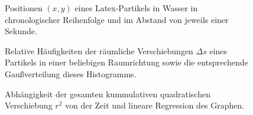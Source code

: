 \documentclass[12pt,a4paper,german]{scrartcl}
\numberwithin{equation}{section}
\begin{document}
  \begin{figure}[H]
    \centering
    
    \caption{Positionen $(x, y)$ eines Latex-Partikels in Wasser in chronologischer Reihenfolge und im Abstand von jeweils einer Sekunde.}
  \end{figure}

  \begin{figure}[H]
    \centering
    
    \caption{Relative Häufigkeiten der räumliche Verschiebungen $\Delta s$ eines Partikels in einer beliebigen Raumrichtung sowie die entsprechende Gaußverteilung dieses Histogramms.}
  \end{figure}

  \begin{figure}[H]
    \centering
    
    \caption[short]{Abhängigkeit der gesamten kummulativen quadratischen Verschiebung $r^2$ von der Zeit und lineare Regression des Graphen.}
  \end{figure}
\end{document}
